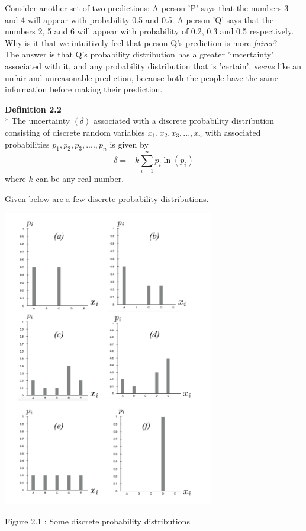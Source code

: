 \documentclass[oneside]{book}
\begin{document}
Consider another set of two predictions: A person 'P' says that the numbers 3 and 4 will appear with probability 0.5 and 0.5. A person 'Q' says that the numbers 2, 5 and 6 will appear with probability of 0.2, 0.3 and 0.5 respectively. Why is it that we intuitively feel that person Q's prediction is more \emph{fairer}?\\

The answer is that Q's probability distribution has a greater 'uncertainty' associated with it, and any probability distribution that is 'certain', \emph{seems} like an unfair and unreasonable prediction, because both the people have the same information before making their prediction.

\begin{mdframed}[style=exercise]
\textbf{Definition 2.2}
 \\* The uncertainty $(\delta)$ associated with a discrete probability distribution consisting of discrete random variables $x_1,x_2,x_3,...,x_n$ with associated probabilities $p_1,p_2,p_3,....,p_n$ is given by
 \[ \delta = -k\sum_{i= 1}^{n}p_i\ln(p_i) \]
 where $k$ can be any real number.
 \end{mdframed}
 
Given below are a few discrete probability distributions. 


\begin{center}
\includegraphics[width = 11 cm, height = 13cm ]{Numbers}%
\end{center}
\begin{center}
Figure 2.1 : Some discrete probability distributions\\
\end{center}
\end{document}
